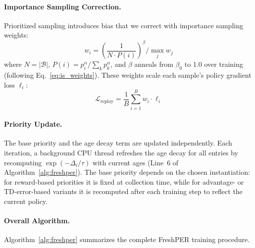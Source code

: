 \documentclass[runningheads]{llncs}
\newcommand{\method}{FreshPER}
\begin{document}
\paragraph{Importance Sampling Correction.}
Prioritized sampling introduces bias that we correct with importance sampling weights:
\begin{equation}
    w_i = \left( \frac{1}{N \cdot P(i)} \right)^\beta \bigg/ \max_j w_j
    \label{eq:is_correction}
\end{equation}
where $N = |\mathcal{B}|$, $P(i) = p_i^\alpha / \sum_k p_k^\alpha$, and $\beta$ anneals from $\beta_0$ to 1.0 over training (following Eq.~\eqref{eq:is_weights}). These weights scale each sample's policy gradient loss $\ell_i$:
\begin{equation}
    \mathcal{L}_{\text{replay}} = \frac{1}{B} \sum_{i=1}^{B} w_i \cdot \ell_i
    \label{eq:weighted_loss}
\end{equation}

\paragraph{Priority Update.}
The base priority and the age decay term are updated independently. Each iteration, a background CPU thread refreshes the age decay for all entries by recomputing $\exp(-\Delta_i/\tau)$ with current ages (Line~6 of Algorithm~\ref{alg:freshper}). The base priority depends on the chosen instantiation: for reward-based priorities it is fixed at collection time, while for advantage- or TD-error-based variants it is recomputed after each training step to reflect the current policy.

\paragraph{Overall Algorithm.}
Algorithm~\ref{alg:freshper} summarizes the complete \method{} training procedure.
\end{document}
